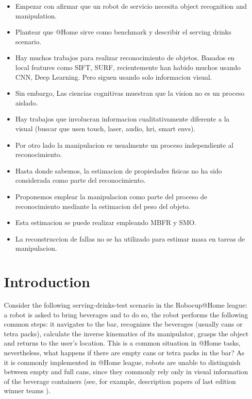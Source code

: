 \documentclass[a4paper, 10pt]{article}
\begin{document}
\begin{itemize}
\item Empezar con afirmar que un robot de servicio necesita object recognition and manipulation.
  \item Plantear que @Home sirve como benchmark y describir el serving drinks scenario. 
\item Hay muchos trabajos para realizar reconocimiento de objetos. Basados en local features como SIFT, SURF, recientemente han habido muchos usando CNN, Deep Learning. Pero siguen usando solo informacion visual.
\item Sin embargo, Las ciencias cognitivas muestran que la vision no es un proceso aislado.
\item Hay trabajos que involucran informacion cualitativamente diferente a la visual (buscar que usen touch, laser, audio, hri, smart envs).
\item Por otro lado la manipulacion es usualmente un proceso independiente al reconocimiento.
\item Hasta donde sabemos, la estimacion de propiedades fisicas no ha sido considerada como parte del reconocimiento.
\item Proponemos emplear la manipulacion como parte del proceso de reconocimiento mediante la estimacion del peso del objeto.
\item Esta estimacion se puede realizar empleando MBFR y SMO.
\item La reconstruccion de fallas no se ha utilizado para estimar masa en tareas de manipulacion.
\end{itemize}

\section{Introduction}
\thispagestyle{mypagestyle}
Consider the following serving-drinks-test scenario in the Robocup@Home league: a robot is asked to bring beverages and to do so, the robot performs the following common steps: it navigates to the bar, recognizes the beverages (usually cans or tetra packs), calculate the inverse kinematics of its manipulator, grasps the object and returns to the user's location. This is a common situation in @Home tasks, nevertheless, what happens if there are empty cans or tetra packs in the bar? As it is commonly implemented in @Home league, robots are unable to distinguish between empty and full cans, since they commonly rely only in visual information of the beverage containers (see, for example, description papers of last edition winner teams \cite{tdp2019Eindhoven, tdp2019Homer, tdp2019UTS}).
\end{document}
